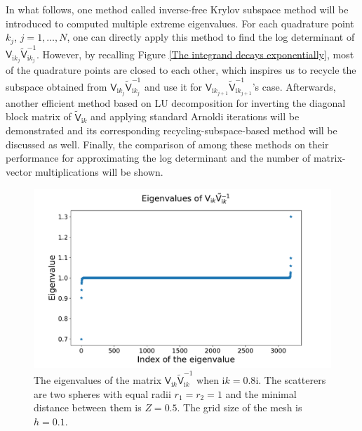 In what follows, one method called inverse-free Krylov subspace method will be introduced to computed multiple extreme eigenvalues. For each quadrature point
$k_{j}$, $j = 1, \dots, N$, one can directly apply this method to find the log determinant of 
$\mathsf{V}_{\mathrm{i}k_{j}}\tilde{\mathsf{V}}_{\mathrm{i}k_{j}}^{-1}$. However, by recalling Figure 
\ref{The integrand decays exponentially}, most of the quadrature points are closed to each other, which inspires us to recycle the subspace obtained from 
$\mathsf{V}_{\mathrm{i}k_{j}}\tilde{\mathsf{V}}_{\mathrm{i}k_{j}}^{-1}$ and use it for $\mathsf{V}_{\mathrm{i}k_{j+1}}\tilde{\mathsf{V}}_{\mathrm{i}k_{j+1}}^{-1}$'s case.
Afterwards, another efficient method based on LU decomposition for inverting the diagonal block matrix of $\tilde{\mathsf{V}}_{\mathrm{i}k}$ and applying
standard Arnoldi iterations will be demonstrated and its corresponding recycling-subspace-based method will be discussed as well.
Finally, the comparison of among these methods on their performance for approximating the log determinant and the number of matrix-vector multiplications 
will be shown.
\begin{figure}[H]
    \centering
    \includegraphics[scale = 0.5]{figures/eigenvalue_of_VVtilde.pdf}
    \caption{The eigenvalues of the matrix $\mathsf{V}_{\mathrm{i}k}\tilde{\mathsf{V}}_{\mathrm{i}k}^{-1}$ when $\mathrm{i}k = 0.8\mathrm{i}$.
    The scatterers are two spheres with equal radii $r_{1} = r_{2} = 1$ and the minimal distance between them is $Z = 0.5$. The grid size of the mesh is $h = 0.1$.}
    \label{eigenvalues of VVtilde}
\end{figure}
